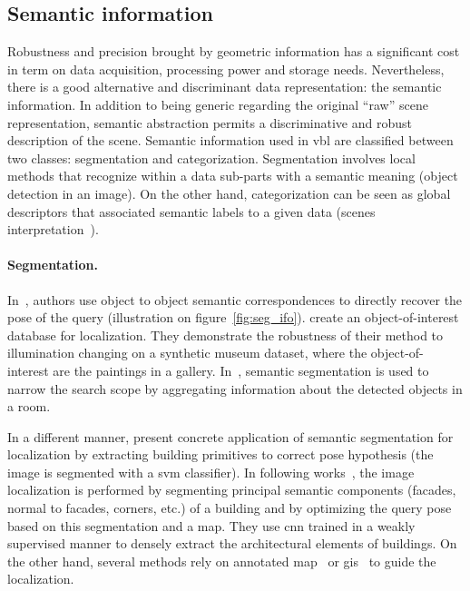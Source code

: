 	\subsection{Semantic information}
		\label{subsec:semantic_info}
		Robustness and precision brought by geometric information has a significant cost in term on data acquisition, processing power and storage needs. Nevertheless, there is a good alternative and discriminant data representation: the semantic information. In addition to being generic regarding the original ``raw'' scene representation, semantic abstraction permits a discriminative and robust description of the scene. Semantic information used in \ac{vbl} are classified between two classes: segmentation and categorization. Segmentation involves local methods that recognize within a data sub-parts with a semantic meaning (\eg object detection in an image). On the other hand, categorization can be seen as global descriptors that associated semantic labels to a given data (\eg scenes interpretation~\citep{Deng2009}).
		
		\paragraph{Segmentation.}
			 In~\citep{Ardeshir2014,Castaldo2015,Christie2016,Weinzaepfel2019}, authors use object to object semantic correspondences to directly recover the pose of the query (illustration on figure~\ref{fig:seg_ifo}). \citet{Weinzaepfel2019} create an object-of-interest database for localization. They demonstrate the robustness of their method to illumination changing on a synthetic museum dataset, where the object-of-interest are the paintings in a gallery. In~\citep{Lu2015}, semantic segmentation is used to narrow the search scope by aggregating information about the detected objects in a room.

 			 In a different manner, \citet{Arth2015} present concrete application of semantic segmentation for localization by extracting building primitives to correct pose hypothesis (the image is segmented with a \ac{svm} classifier). In following works~\citep{Armagan2017a,Armagan2017b,Armagan2017}, the image localization is performed by segmenting principal semantic components (facades, normal to facades, corners, etc.) of a building and by optimizing the query pose based on this segmentation and a map. They use \ac{cnn} trained in a weakly supervised manner to densely extract the architectural elements of buildings. On the other hand, several methods rely on annotated map~\citep{Atanasov2016,Wang2015} or \ac{gis}~\citep{Ardeshir2014,Castaldo2015,Qu2015} to guide the localization.
 			
